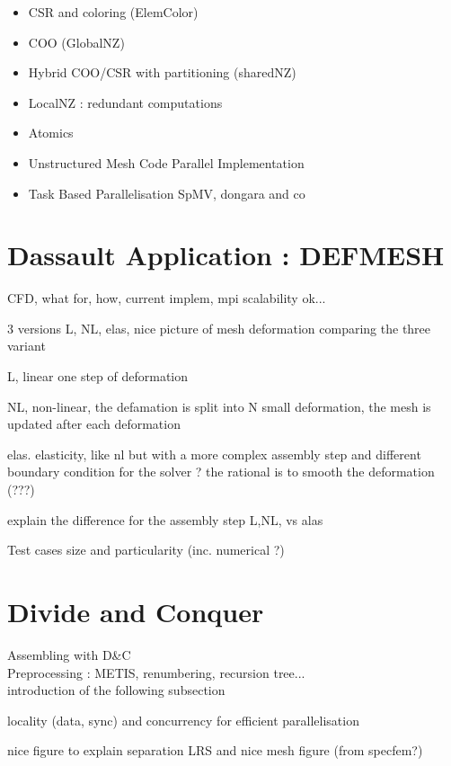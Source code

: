 \documentclass{IOS-Book-Article}
\begin{document}
\begin{itemize}
 \item CSR and coloring (ElemColor)
 \item COO (GlobalNZ)
 \item Hybrid COO/CSR with partitioning (sharedNZ)
 \item LocalNZ : redundant computations
 \item Atomics\\
 
 \item Unstructured Mesh Code Parallel Implementation
 \item Task Based Parallelisation SpMV, dongara and co \cite{MPI_task}
\end{itemize}

\section{Dassault Application : DEFMESH}

CFD, what for, how, current implem, mpi scalability ok...

3 versions L, NL, elas, nice picture of mesh deformation comparing the three variant

L, linear one step of deformation

NL, non-linear, the defamation is split into N small deformation, the mesh is updated after each deformation

elas. elasticity, like nl but with a more complex assembly step and different boundary condition for the solver ? the rational is to smooth the deformation (???)


explain the difference for the assembly step L,NL, vs alas

Test cases size and particularity (inc. numerical ?)



\section{Divide and Conquer}

Assembling with D\&C \\
Preprocessing : METIS, renumbering, recursion tree...\\

introduction of the following subsection

locality (data, sync) and concurrency for efficient parallelisation

nice figure to explain separation LRS and nice mesh figure (from specfem?)
\end{document}
